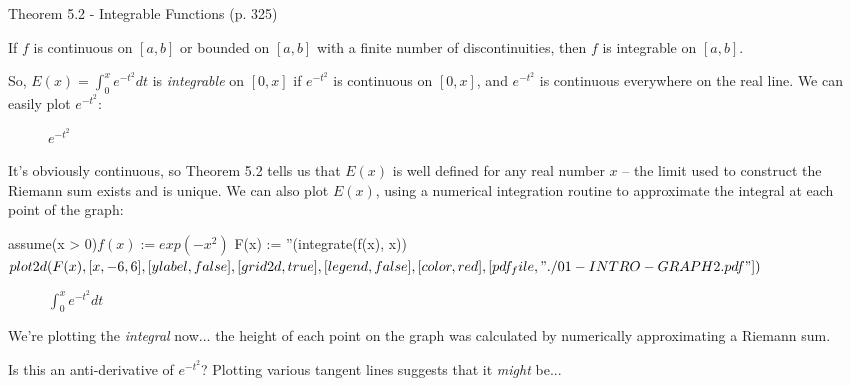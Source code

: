 \begin{framed}
\cite{briggs} Theorem 5.2 - Integrable Functions (p. 325)

If $f$ is continuous on $[a,b]$ or bounded on $[a,b]$ with a finite number of discontinuities,
then $f$ is integrable on $[a,b]$.
\end{framed}

So, $E(x) = \int_0^x e^{-t^2} dt$ is {\it integrable} on $[0,x]$ if $e^{-t^2}$ is continuous on $[0,x]$,
and $e^{-t^2}$ is continuous everywhere on the real line.  We can easily plot $e^{-t^2}$:


\begin{figure}[H]
\begin{center}
\end{center}
\caption{$e^{-t^2}$}
\end{figure}

It's obviously continuous, so Theorem 5.2 tells us that $E(x)$ is well
defined for any real number $x$ -- the limit used to construct the
Riemann sum exists and is unique.  We can also plot $E(x)$, using a
numerical integration routine to approximate the integral at each
point of the graph:

\begin{maximacode}
assume(x > 0)$
f(x) := exp(-x^2)$
F(x) := ''(integrate(f(x), x))$
plot2d (F(x),
        [x, -6, 6], [ylabel, false], [grid2d, true], [legend, false],
        [color, red],
        [pdf_file, "./01-INTRO-GRAPH2.pdf"])$
\end{maximacode}

\begin{figure}[H]
\begin{center}
\end{center}
\caption{$\int_0^x e^{-t^2} dt$}
\end{figure}

We're plotting the {\it integral} now... the height of each point on the graph
was calculated by numerically approximating a Riemann sum.

Is this an anti-derivative of $e^{-t^2}$?  Plotting various tangent lines suggests
that it {\it might} be...

